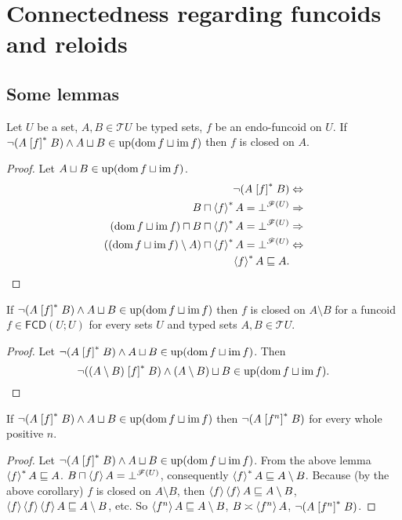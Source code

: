 
\chapter{Connectedness regarding funcoids and reloids}


\section{Some lemmas}
\begin{lem}
Let $U$ be a set, $A,B\in\mathscr{T}U$ be typed sets, $f$ be an
endo-funcoid on $U$. If $\neg(A\mathrel{\left[f\right]^{\ast}}B)\wedge A\sqcup B\in\operatorname{up}(\operatorname{dom} f\sqcup\operatorname{im} f)$
then $f$ is closed on $A$.\end{lem}
\begin{proof}
Let $A\sqcup B\in\operatorname{up}(\operatorname{dom} f\sqcup\operatorname{im} f)$.
\begin{align*}
\lnot(A\mathrel{\left[f\right]^{\ast}}B) & \Leftrightarrow\\
B\sqcap\left\langle f\right\rangle ^{\ast}A=\bot^{\mathscr{F}(U)} & \Rightarrow\\
(\operatorname{dom} f\sqcup\operatorname{im} f)\sqcap B\sqcap\left\langle f\right\rangle ^{\ast}A=\bot^{\mathscr{F}(U)} & \Rightarrow\\
((\operatorname{dom} f\sqcup\operatorname{im} f)\setminus A)\sqcap\left\langle f\right\rangle ^{\ast}A=\bot^{\mathscr{F}(U)} & \Leftrightarrow\\
\left\langle f\right\rangle ^{\ast}A\sqsubseteq A.
\end{align*}
\end{proof}
\begin{cor}
If $\neg(A\mathrel{\left[f\right]^{\ast}}B)\wedge A\sqcup B\in\operatorname{up}(\operatorname{dom} f\sqcup\operatorname{im} f)$ then
$f$ is closed on $A\setminus B$ for a funcoid $f\in\mathsf{FCD}(U;U)$
for every sets $U$ and typed sets $A,B\in\mathscr{T}U$.\end{cor}
\begin{proof}
Let $\neg(A\mathrel{\left[f\right]^{\ast}}B)\wedge A\sqcup B\in\operatorname{up}(\operatorname{dom} f\sqcup\operatorname{im} f)$. Then
\[
\lnot((A\setminus B)\mathrel{\left[f\right]^{\ast}}B)\land(A\setminus B)\sqcup B\in\operatorname{up}(\operatorname{dom} f\sqcup\operatorname{im} f).
\]
\end{proof}
\begin{lem}
If $\neg(A\mathrel{\left[f\right]^{\ast}}B)\wedge A\sqcup B\in\operatorname{up}(\operatorname{dom} f\sqcup\operatorname{im} f)$ then
$\lnot(A\mathrel{\left[f^{n}\right]^{\ast}}B)$ for every whole positive $n$.\end{lem}
\begin{proof}
Let $\neg(A\mathrel{\left[f\right]^{\ast}}B)\wedge A\sqcup B\in\operatorname{up}(\operatorname{dom} f\sqcup\operatorname{im} f)$. From
the above lemma $\left\langle f\right\rangle ^{\ast}A\sqsubseteq A$. $B\sqcap\left\langle f\right\rangle A=\bot^{\mathscr{F}(U)}$,
consequently $\left\langle f\right\rangle ^{\ast}A\sqsubseteq A\setminus B$. Because (by the
above corollary) $f$ is closed on $A\setminus B$, then $\left\langle f\right\rangle\left\langle f\right\rangle A\sqsubseteq A\setminus B$,
$\left\langle f\right\rangle\left\langle f\right\rangle\left\langle f\right\rangle A\sqsubseteq A\setminus B$, etc. So $\left\langle f^{n}\right\rangle A\sqsubseteq A\setminus B$,
$B\asymp\left\langle f^{n}\right\rangle A$, $\lnot(A\mathrel{\left[f^{n}\right]^{\ast}}B)$.
\end{proof}

